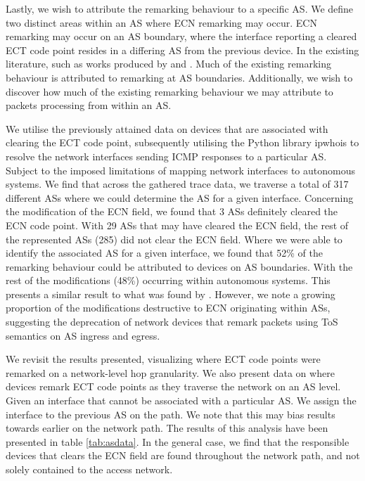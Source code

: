 \documentclass{l4proj}
\begin{document}
Lastly, we wish to attribute the remarking behaviour to a specific AS. We define two distinct areas within an AS where ECN remarking may occur. ECN remarking may occur on an AS boundary, where the interface reporting a cleared ECT code point resides in a differing AS from the previous device. In the existing literature, such as works produced by \cite{mcquistin_is_2015} and \cite{bauer_measuring_2011}. Much of the existing remarking behaviour is attributed to remarking at AS boundaries.
Additionally, we wish to discover how much of the existing remarking behaviour we may attribute to packets processing from within an AS.

We utilise the previously attained data on devices that are associated with clearing the ECT code point, subsequently utilising the Python library ipwhois to resolve the network interfaces sending ICMP responses to a particular AS. Subject to the imposed limitations of mapping network interfaces to autonomous systems\cite{mapping_accuracy}. We find that across the gathered trace data, we traverse a total of 317 different ASs where we could determine the AS for a given interface. Concerning the modification of the ECN field, we found that 3 ASs definitely cleared the ECN code point. With 29 ASs that may have cleared the ECN field, the rest of the represented ASs (285) did not clear the ECN field. Where we were able to identify the associated AS for a given interface, we found that 52\% of the remarking behaviour could be attributed to devices on AS boundaries. With the rest of the modifications (48\%) occurring within autonomous systems. This presents a similar result to what was found by \cite{mcquistin_is_2015}. However, we note a growing proportion of the modifications destructive to ECN originating within ASs, suggesting the deprecation of network devices that remark packets using ToS semantics on AS ingress and egress.

We revisit the results presented, visualizing where ECT code points were remarked on a network-level hop granularity. We also present data on where devices remark ECT code points as they traverse the network on an AS level. Given an interface that cannot be associated with a particular AS. We assign the interface to the previous AS on the path. We note that this may bias results towards earlier on the network path. The results of this analysis have been presented in table \ref{tab:asdata}. In the general case, we find that the responsible devices that clears the ECN field are found throughout the network path, and not solely contained to the access network.
\end{document}
